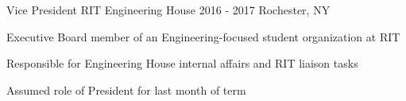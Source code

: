 
\begin{cvexperiences}
	\cvexperience
		{Vice President}
		{RIT Engineering House}
		{2016 - 2017}
		{Rochester, NY}
		{
			\begin{cvitems}
			\item {Executive Board member of an Engineering-focused student organization at RIT}
			\item {Responsible for Engineering House internal affairs and RIT liaison tasks}
			\item {Assumed role of President for last month of term}
			\end{cvitems}
		}

\end{cvexperiences}
